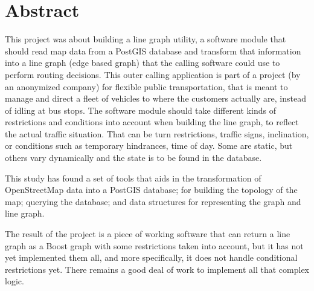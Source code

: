 \documentclass[../main.tex]{subfiles}
\begin{document}
\chapter*{Abstract}
This project was about building a line graph utility, a software module that should read map data
from a PostGIS database and transform that information into a line graph (edge based graph) that the calling software could use to perform routing decisions. This outer calling application is part of a project (by an anonymized company) for flexible public transportation, that is meant to manage and direct a fleet of vehicles to where the customers actually are, instead of idling at bus stops. The software module should take different kinds of restrictions and conditions into account when building the line graph, to reflect the actual traffic situation. That can be turn restrictions, traffic signs, inclination, or conditions such as temporary hindrances, time of day. Some are static, but others vary dynamically and the state is to be found in the database.

This study has found a set of tools that aids in the transformation of OpenStreetMap data into a PostGIS database; for building the topology of the map; querying the database; and data structures for representing the graph and line graph. 

The result of the project is a piece of working software that can return a line graph as a Boost graph with some restrictions taken into account, but it has not yet implemented them all, and more specifically, it does not handle conditional restrictions yet. There remains a good deal of work to implement all that complex logic.
\end{document}
